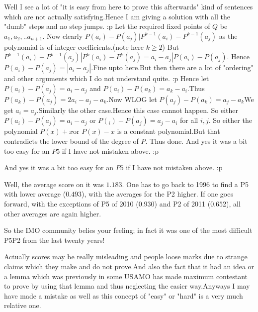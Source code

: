\begin{solution}
	Well I see a lot of "it is easy from here to prove this afterwards" kind of sentences which are not actually satisfying.Hence I am giving a solution with all the "dumb" steps and no step jumps. :p
Let the required fixed points of $Q$ be $a_1,a_2,..a_{n+1}$.
Now clearly $P(a_i)-P(a_j)|P^{k-1}(a_i)-P^{k-1}(a_j)$ as the polynomial is of integer coefficients.(note here $k \ge 2$)
But $P^{k-1}(a_i)-P^{k-1}(a_j)|P^{k}(a_i)-P^k(a_j)=a_i-a_j|P(a_i)-P(a_j).$
Hence $P(a_i)-P(a_j)=|a_i-a_j|$.Fine upto here.But then there are a lot of "ordering" and other arguments which I do not understand quite. :p
Hence let $P(a_i)-P(a_j)=a_i-a_j$ and $P(a_i)-P(a_k)=a_k-a_i$.Thus $P(a_k)-P(a_j)=2a_i-a_j-a_k$.Now WLOG let $P(a_j)-P(a_k)=a_j-a_k$We get $a_i=a_j$.Similarly the other case.Hence this case cannot happen.
So either $P(a_i)-P(a_j)=a_i-a_j$ or $P(_i)-P(a_j)=a_j-a_i$ for all $i,j$.
So either the polynomial $P(x)+x$or $P(x)-x$ is a constant polynomial.But that contradicts the lower bound of the degree of $P$. Thus done.
And yes it was a bit too easy for an $P5$ if I have not mistaken above. :p
\end{solution}



\begin{solution}
	\begin{tcolorbox}And yes it was a bit too easy for an $P5$ if I have not mistaken above. :p\end{tcolorbox}
Well, the average score on it was $1.183$. One has to go back to 1996 to find a P5 with lower average ($0.493$), with the averages for the P2 higher. 
If one goes forward, with the exceptions of P5 of 2010 ($0.930$) and P2 of 2011 ($0.652$), all other averages are again higher.

So the IMO community belies your feeling; in fact it was one of the most difficult P5\/P2 from the last twenty years!
\end{solution}



\begin{solution}
	Actually scores may be really misleading and people loose marks due to strange claims which they make and do not prove.And also the fact that it had an idea or a lemma which was previously in some USAMO has made maximum contestant to prove by using that lemma and thus neglecting the easier way.Anyways I may have made a mistake as well as this concept of "easy" or "hard" is a very much relative one.
\end{solution}



